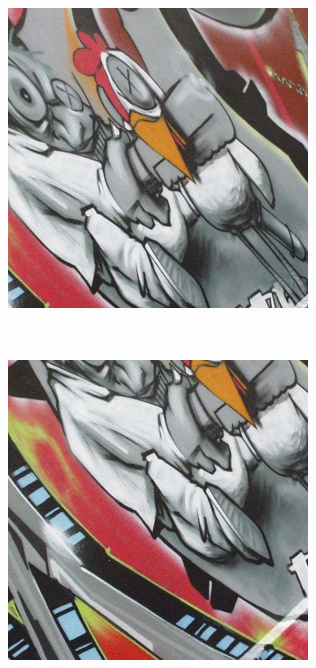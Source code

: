 \documentclass[review]{elsarticle}
\begin{document}
\begin{figure}[htb]
    \begin{subfigure}[t]{0.16\columnwidth}
        \centering
        \includegraphics[width=1\columnwidth]{images/acr/patches/patch_1_2}
    \end{subfigure}%
    ~~ %
    \begin{subfigure}[t]{0.16\columnwidth}
        \centering
        \includegraphics[width=1\columnwidth]{images/acr/patches/patch_2_2}

\end{subfigure}
\end{figure}
\end{document}
